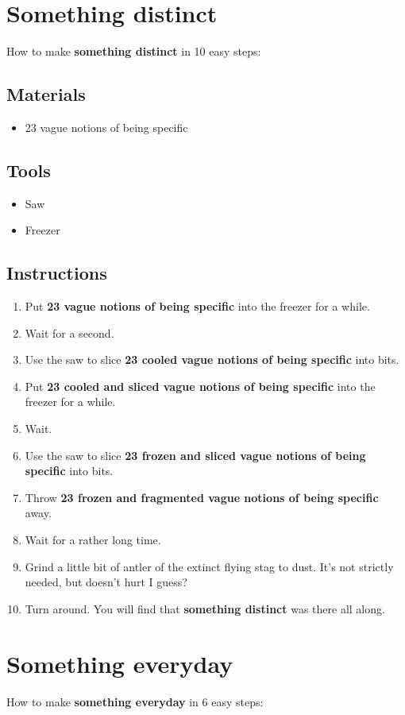 \documentclass{article}
\begin{document}
\section{Something distinct}How to make \textbf{something distinct} in 10 easy steps:

\subsection{Materials}\begin{itemize}
\item 
23 vague notions of being specific
\end{itemize}
\subsection{Tools}\begin{itemize}
\item 
Saw
\item 
Freezer
\end{itemize}
\subsection{Instructions}\begin{enumerate}
\item 
Put \textbf{23 vague notions of being specific} into the freezer for a while.
\item 
Wait for a second.
\item 
Use the saw to slice \textbf{23 cooled vague notions of being specific} into bits.
\item 
Put \textbf{23 cooled and sliced vague notions of being specific} into the freezer for a while.
\item 
Wait.
\item 
Use the saw to slice \textbf{23 frozen and sliced vague notions of being specific} into bits.
\item 
Throw \textbf{23 frozen and fragmented vague notions of being specific} away.
\item 
Wait for a rather long time.
\item 
Grind a little bit of antler of the extinct flying stag to dust. It's not strictly needed, but doesn't hurt I guess?
\item 
Turn around. You will find that \textbf{something distinct} was there all along.
\end{enumerate}
\newpage
\section{Something everyday}How to make \textbf{something everyday} in 6 easy steps:
\end{document}
